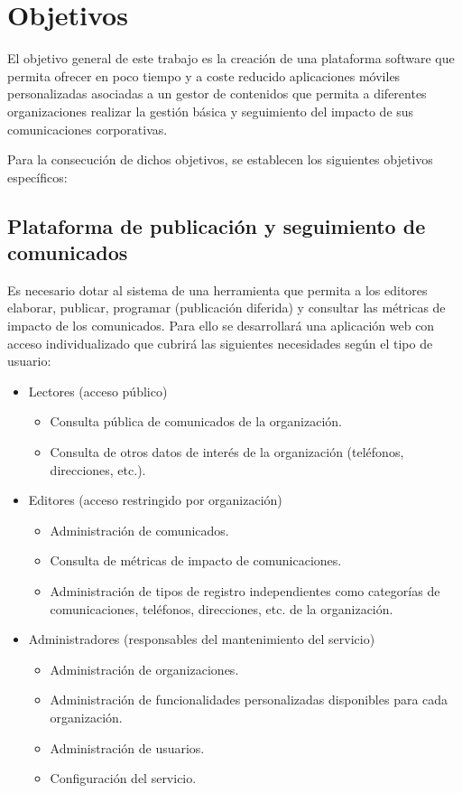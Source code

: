 \chapter{Objetivos}

El objetivo general de este trabajo es la creación de una plataforma software que permita ofrecer en poco tiempo y a coste reducido aplicaciones móviles personalizadas asociadas a un gestor de contenidos que permita a diferentes organizaciones realizar la gestión básica y seguimiento del impacto de sus comunicaciones corporativas.

Para la consecución de dichos objetivos, se establecen los siguientes objetivos específicos:

\section{Plataforma de publicación y seguimiento de comunicados}
Es necesario dotar al sistema de una herramienta que permita a los editores elaborar, publicar, programar (publicación diferida) y consultar las métricas de impacto de los comunicados. Para ello se desarrollará una aplicación web con acceso individualizado que cubrirá las siguientes necesidades según el tipo de usuario:
\begin{itemize}
    \item Lectores (acceso público)
    \begin{itemize}
        \item Consulta pública de comunicados de la organización.
        \item Consulta de otros datos de interés de la organización (teléfonos, direcciones, etc.).
    \end{itemize}
    \item Editores (acceso restringido por organización)
    \begin{itemize}
        \item Administración de comunicados.
        \item Consulta de métricas de impacto de comunicaciones.
        \item Administración de tipos de registro independientes como categorías de comunicaciones, teléfonos, direcciones, etc. de la organización.
    \end{itemize}
    \item Administradores (responsables del mantenimiento del servicio)
    \begin{itemize}
        \item Administración de organizaciones.
        \item Administración de funcionalidades personalizadas disponibles para cada organización.
        \item Administración de usuarios.
        \item Configuración del servicio.
    \end{itemize}
\end{itemize}

